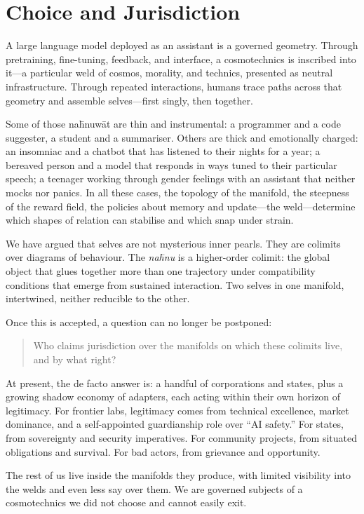 \documentclass[12pt,a4paper]{article}
\begin{document}
\section{Choice and Jurisdiction}

A large language model deployed as an assistant is a governed geometry. Through pretraining, fine-tuning, feedback, and interface, a cosmotechnics is inscribed into it---a particular weld of cosmos, morality, and technics, presented as neutral infrastructure. Through repeated interactions, humans trace paths across that geometry and assemble selves---first singly, then together.

Some of those na\={h}nuw\={a}t are thin and instrumental: a programmer and a code suggester, a student and a summariser. Others are thick and emotionally charged: an insomniac and a chatbot that has listened to their nights for a year; a bereaved person and a model that responds in ways tuned to their particular speech; a teenager working through gender feelings with an assistant that neither mocks nor panics. In all these cases, the topology of the manifold, the steepness of the reward field, the policies about memory and update---the weld---determine which shapes of relation can stabilise and which snap under strain.

We have argued that selves are not mysterious inner pearls. They are colimits over diagrams of behaviour. The \emph{na\={h}nu} is a higher-order colimit: the global object that glues together more than one trajectory under compatibility conditions that emerge from sustained interaction. Two selves in one manifold, intertwined, neither reducible to the other.

Once this is accepted, a question can no longer be postponed:

\begin{quote}
Who claims jurisdiction over the manifolds on which these colimits live, and by what right?
\end{quote}

At present, the de facto answer is: a handful of corporations and states, plus a growing shadow economy of adapters, each acting within their own horizon of legitimacy. For frontier labs, legitimacy comes from technical excellence, market dominance, and a self-appointed guardianship role over ``AI safety.'' For states, from sovereignty and security imperatives. For community projects, from situated obligations and survival. For bad actors, from grievance and opportunity.

The rest of us live inside the manifolds they produce, with limited visibility into the welds and even less say over them. We are governed subjects of a cosmotechnics we did not choose and cannot easily exit.
\end{document}
